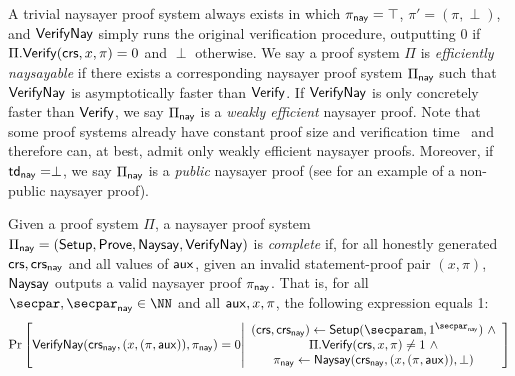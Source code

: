 A trivial naysayer proof system always exists in which $\pi_{\mathsf{nay}} = \top$, $\pi' = (\pi, \perp)$, and ${\mathsf{Verify}}\mathsf{Nay}$ simply runs the original verification procedure, outputting $0$ if $\Pi.\mathsf{Verify}(\mathsf{crs}, x, \pi) = 0$ and $\perp$ otherwise.
We say a proof system $\Pi$ is \emph{efficiently naysayable} if there exists a corresponding naysayer proof system $\Pi_{\mathsf{nay}}$ such that ${\mathsf{Verify}}\mathsf{Nay}$ is asymptotically faster than $\mathsf{Verify}$. If ${\mathsf{Verify}}\mathsf{Nay}$ is only concretely faster than $\mathsf{Verify}$, we say $\Pi_{\mathsf{nay}}$ is a \emph{weakly efficient} naysayer proof. Note that some proof systems already have constant proof size and verification time~\cite{EC:Groth16,C:Schnorr89} and therefore can, at best, admit only weakly efficient naysayer proofs. 
Moreover, if $\mathsf{td}_{\mathsf{nay}} = \perp$, we say $\Pi_{\mathsf{nay}}$ is a \emph{public} naysayer proof (see  for an example of a non-public naysayer proof). 

\begin{definition}
    Given a proof system $\Pi$, a naysayer proof system $\Pi_{\mathsf{nay}} = (\mathsf{Setup}, \mathsf{Prove}, \mathsf{Naysay}, {\mathsf{Verify}}\mathsf{Nay})$ is \emph{complete} if, for all honestly generated $\mathsf{crs}, \mathsf{crs}_{\mathsf{nay}}$ and all values of $\mathsf{aux}$,\footnotemark
    given an invalid statement-proof pair $(x,\pi)$, $\mathsf{Naysay}$ outputs a valid naysayer proof $\pi_{\mathsf{nay}}$. That is, for all $\secpar, \naysecpar \in \NN$ and all $\mathsf{aux},x,\pi$, the following expression equals 1:
\begin{equation*}
    \Pr\left[
        \vrfynay(\crs_{\nay}, (x,(\pi, \aux)), \pi_{\nay})=0 
        \middle| 
        \begin{array}{c}
            (\crs, \crs_{\nay}) \gets \Setup(\secparam, \naysecparam)~\land\\
            \Pi.\vrfy(\crs, x,\pi) \neq 1~\land\\
            \pi_{\nay} \gets \naysay(\crs_{\nay}, (x, (\pi, \aux)), \perp)
        \end{array}
    \right]%
\end{equation*}
\end{definition}

